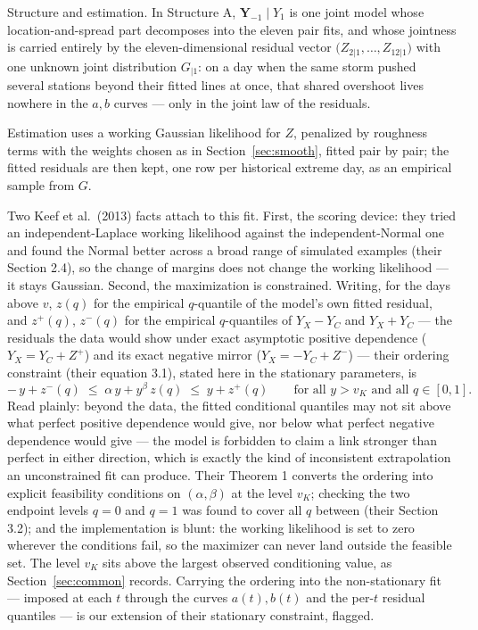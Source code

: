 \documentclass[11pt]{article}
\begin{document}
Structure and estimation. In Structure A, $\mathbf{Y}_{-1} \mid Y_1$ is one joint model whose location-and-spread part decomposes into the eleven pair fits, and whose jointness is carried entirely by the eleven-dimensional residual vector $\bigl(Z_{2|1}, \ldots, Z_{12|1}\bigr)$ with one unknown joint distribution $G_{|1}$: on a day when the same storm pushed several stations beyond their fitted lines at once, that shared overshoot lives nowhere in the $a, b$ curves --- only in the joint law of the residuals.

Estimation uses a working Gaussian likelihood for $Z$, penalized by roughness terms with the weights chosen as in Section~\ref{sec:smooth}, fitted pair by pair; the fitted residuals are then kept, one row per historical extreme day, as an empirical sample from $G$.

{\color{green}Two Keef et al.\ (2013) facts attach to this fit. First, the scoring device: they tried an independent-Laplace working likelihood against the independent-Normal one and found the Normal better across a broad range of simulated examples (their Section 2.4), so the change of margins does not change the working likelihood --- it stays Gaussian. Second, the maximization is constrained. Writing, for the days above $v$, $z(q)$ for the empirical $q$-quantile of the model's own fitted residual, and $z^{+}(q)$, $z^{-}(q)$ for the empirical $q$-quantiles of $Y_X - Y_C$ and $Y_X + Y_C$ --- the residuals the data would show under exact asymptotic positive dependence ($Y_X = Y_C + Z^{+}$) and its exact negative mirror ($Y_X = -Y_C + Z^{-}$) --- their ordering constraint (their equation 3.1), stated here in the stationary parameters, is
\begin{equation}\label{eq:keef}
-\,y + z^{-}(q) \;\le\; \alpha\, y + y^{\beta}\, z(q) \;\le\; y + z^{+}(q) \qquad \text{for all } y > v_K \text{ and all } q \in [0, 1].
\end{equation}
Read plainly: beyond the data, the fitted conditional quantiles may not sit above what perfect positive dependence would give, nor below what perfect negative dependence would give --- the model is forbidden to claim a link stronger than perfect in either direction, which is exactly the kind of inconsistent extrapolation an unconstrained fit can produce. Their Theorem 1 converts the ordering into explicit feasibility conditions on $(\alpha, \beta)$ at the level $v_K$; checking the two endpoint levels $q = 0$ and $q = 1$ was found to cover all $q$ between (their Section 3.2); and the implementation is blunt: the working likelihood is set to zero wherever the conditions fail, so the maximizer can never land outside the feasible set. The level $v_K$ sits above the largest observed conditioning value, as Section~\ref{sec:common} records. Carrying the ordering into the non-stationary fit --- imposed at each $t$ through the curves $a(t), b(t)$ and the per-$t$ residual quantiles --- is our extension of their stationary constraint, flagged.}
\end{document}
